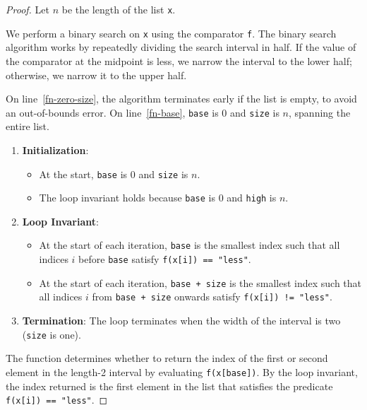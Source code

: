 \documentclass{article}
\begin{document}
\begin{proof}
    Let \( n \) be the length of the list \texttt{x}.

    We perform a binary search on \texttt{x} using the comparator \texttt{f}. 
    The binary search algorithm works by repeatedly dividing the search interval in half. 
    If the value of the comparator at the midpoint is less, we narrow the interval to the lower half; 
    otherwise, we narrow it to the upper half.

    On line~\ref{fn-zero-size}, the algorithm terminates early if the list is empty, to avoid an out-of-bounds error.
    On line~\ref{fn-base}, \texttt{base} is 0 and \texttt{size} is \( n \), spanning the entire list.


    \begin{enumerate}
        \item \textbf{Initialization}:
            \begin{itemize}
                \item At the start, \texttt{base} is 0 and \texttt{size} is \( n \).
                \item The loop invariant holds because \texttt{base} is 0 and \texttt{high} is \( n \).
            \end{itemize}
        \item \textbf{Loop Invariant}:
            \begin{itemize}
                \item At the start of each iteration, \texttt{base} is the smallest index 
                such that all indices $i$ before \texttt{base} satisfy \texttt{f(x[i]) == "less"}.
                \item At the start of each iteration, \texttt{base + size} is the smallest index
                such that all indices $i$ from \texttt{base + size} onwards satisfy \texttt{f(x[i]) != "less"}.
            \end{itemize}
        \item \textbf{Termination}:
            The loop terminates when the width of the interval is two (\texttt{size} is one).
    \end{enumerate}

    The function determines whether to return the index of the first or second element in the length-2 interval by evaluating \texttt{f(x[base])}.
    By the loop invariant, the index returned is the first element in the list that satisfies the predicate \texttt{f(x[i]) == "less"}.
\end{proof}
\end{document}
